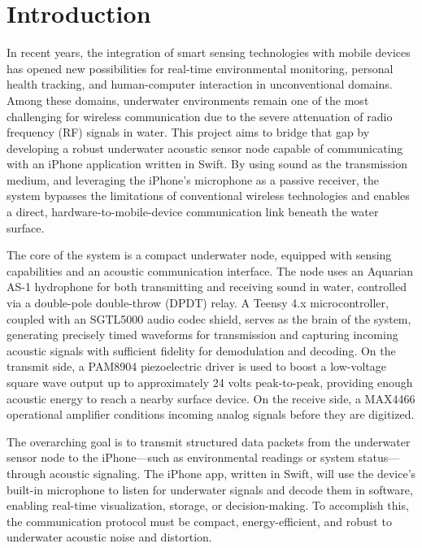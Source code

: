 \chapter{Introduction}

In recent years, the integration of smart sensing technologies with mobile devices has opened new possibilities for real-time environmental monitoring, personal health tracking, and human-computer interaction in unconventional domains. Among these domains, underwater environments remain one of the most challenging for wireless communication due to the severe attenuation of radio frequency (RF) signals in water. This project aims to bridge that gap by developing a robust underwater acoustic sensor node capable of communicating with an iPhone application written in Swift. By using sound as the transmission medium, and leveraging the iPhone’s microphone as a passive receiver, the system bypasses the limitations of conventional wireless technologies and enables a direct, hardware-to-mobile-device communication link beneath the water surface.

The core of the system is a compact underwater node, equipped with sensing capabilities and an acoustic communication interface. The node uses an Aquarian AS-1 hydrophone for both transmitting and receiving sound in water, controlled via a double-pole double-throw (DPDT) relay. A Teensy 4.x microcontroller, coupled with an SGTL5000 audio codec shield, serves as the brain of the system, generating precisely timed waveforms for transmission and capturing incoming acoustic signals with sufficient fidelity for demodulation and decoding. On the transmit side, a PAM8904 piezoelectric driver is used to boost a low-voltage square wave output up to approximately 24 volts peak-to-peak, providing enough acoustic energy to reach a nearby surface device. On the receive side, a MAX4466 operational amplifier conditions incoming analog signals before they are digitized.

The overarching goal is to transmit structured data packets from the underwater sensor node to the iPhone—such as environmental readings or system status—through acoustic signaling. The iPhone app, written in Swift, will use the device’s built-in microphone to listen for underwater signals and decode them in software, enabling real-time visualization, storage, or decision-making. To accomplish this, the communication protocol must be compact, energy-efficient, and robust to underwater acoustic noise and distortion.


